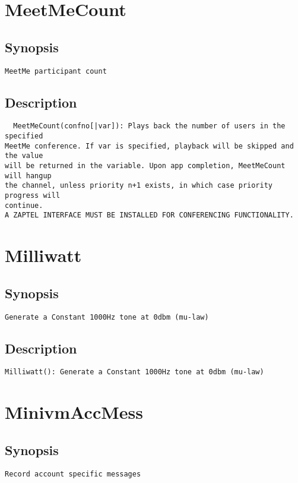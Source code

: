 \section{MeetMeCount}
\subsection{Synopsis}
\begin{verbatim}
MeetMe participant count
\end{verbatim}
\subsection{Description}
\begin{verbatim}
  MeetMeCount(confno[|var]): Plays back the number of users in the specified
MeetMe conference. If var is specified, playback will be skipped and the value
will be returned in the variable. Upon app completion, MeetMeCount will hangup
the channel, unless priority n+1 exists, in which case priority progress will
continue.
A ZAPTEL INTERFACE MUST BE INSTALLED FOR CONFERENCING FUNCTIONALITY.

\end{verbatim}


\section{Milliwatt}
\subsection{Synopsis}
\begin{verbatim}
Generate a Constant 1000Hz tone at 0dbm (mu-law)
\end{verbatim}
\subsection{Description}
\begin{verbatim}
Milliwatt(): Generate a Constant 1000Hz tone at 0dbm (mu-law)

\end{verbatim}


\section{MinivmAccMess}
\subsection{Synopsis}
\begin{verbatim}
Record account specific messages
\end{verbatim}
